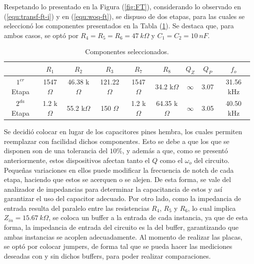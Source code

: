 Respetando lo presentado en la Figura (\ref{fig:FT}), considerando lo observado en (\ref{equ:transf-ft-i}) y en (\ref{equ:woq-ft}), se dispuso de dos etapas, para las cuales se seleccionó los componentes presentados en la Tabla (\ref{tab:componentes}). Se destaca que, para ambos casos, se optó por $R_4 = R_5 = R_6 = 47 \ k\Omega$ y $C_1 = C_2 = 10 \ nF$.

\begin{table}[H]
\centering
\begin{tabular}{ccccccccc}
\hline 
 & $R_1$ & $R_2$ & $R_3$ & $R_7$ & $R_8$ & $Q_Z$ & $Q_P$ & $f_o$ \\
 \hline
$1^{er}$ Etapa & 1547 $\Omega$ & 46.38 k$\Omega$ & 121.22 $\Omega$ & 1547 $\Omega$ & 34.2 k$\Omega$ & $\infty$ & 3.07 & 31.56 kHz \\
$2^{da}$ Etapa & 1.2 k$\Omega$ & 55.2 k$\Omega$ & 150 $\Omega$ & 1.2 k$\Omega$ & 64.35 k$\Omega$ & $\infty$ & 3.05 & 40.50 kHz \\
\hline
\end{tabular}
\caption{Componentes seleccionados.}
\label{tab:componentes}
\end{table} 

Se decidió colocar en lugar de los capacitores pines hembra, los cuales permiten reemplazar con facilidad dichos componentes. Esto se debe a que los que se disponen son de una tolerancia del $10 \%$, y además a que, como se presentó anteriormente, estos dispositivos afectan tanto el $Q$ como el $\omega_o$ del circuito. Pequeñas variaciones en ellos puede modificar la frecuencia de notch de cada etapa, haciendo que estos se acerquen o se alejen. De esta forma, se vale del analizador de impedancias para determinar la capacitancia de estos y así garantizar el uso del capacitor adecuado. Por otro lado, como la impedancia de entrada resulta del paralelo entre las resistencias $R_4$, $R_5$ y $R_6$, lo cual implica $Z_{in} = 15.67 \ k\Omega$, se coloca un buffer a la entrada de cada instancia, ya que de esta forma, la impedancia de entrada del circuito es la del buffer, garantizando que ambas instancias se acoplen adecuadamente. 
Al momento de realizar las placas, se optó por colocar jumpers, de forma tal que se pueda hacer las mediciones deseadas con y sin dichos buffers, para poder realizar comparaciones.   


